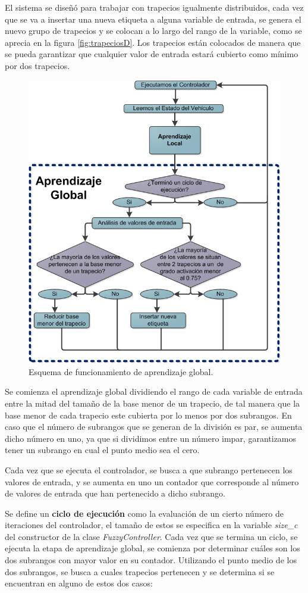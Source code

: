 El sistema se diseñó para trabajar con trapecios igualmente distribuidos, cada vez que se va a insertar una nueva etiqueta a alguna variable de entrada, se genera el nuevo grupo de trapecios y se colocan a lo largo del rango de la variable, como se aprecia en la figura \ref{fig:trapeciosD}. Los trapecios están colocados de manera que se pueda garantizar que cualquier valor de entrada estará cubierto como mínimo por dos trapecios.

\begin{figure}[!htb]
\centering
\includegraphics[width=0.75\linewidth, height = 10 cm]{figures/EsquemaGlobal.png}
\caption{Esquema de funcionamiento de aprendizaje global.}
\label{fig:esquemaG}
\end{figure} 

Se comienza el aprendizaje global dividiendo el rango de cada variable de entrada entre la mitad del tamaño de la base menor de un trapecio, de tal manera que la base menor de cada trapecio este cubierta por lo menos por dos subrangos. En caso que el número de subrangos que se generan de la división es par, se aumenta dicho número en uno, ya que si dividimos entre un número impar, garantizamos tener un subrango en cual el punto medio sea el cero.

Cada vez que se ejecuta el controlador, se busca a que subrango pertenecen los valores de entrada, y se aumenta en uno un contador que corresponde al número de valores de entrada que han pertenecido a dicho subrango. 

Se define un \textbf{ciclo de ejecución} como la evaluación de un cierto número de iteraciones del controlador, el tamaño de estos se especifica en la variable \textit{size\_c} del constructor de la clase \textit{FuzzyController}. Cada vez que se termina un ciclo, se ejecuta la etapa de aprendizaje global, se comienza por determinar cuáles son los dos subrangos con mayor valor en su contador. Utilizando el punto medio de los dos subrangos, se busca a cuales trapecios pertenecen y se determina si se encuentran en alguno de estos dos casos:

